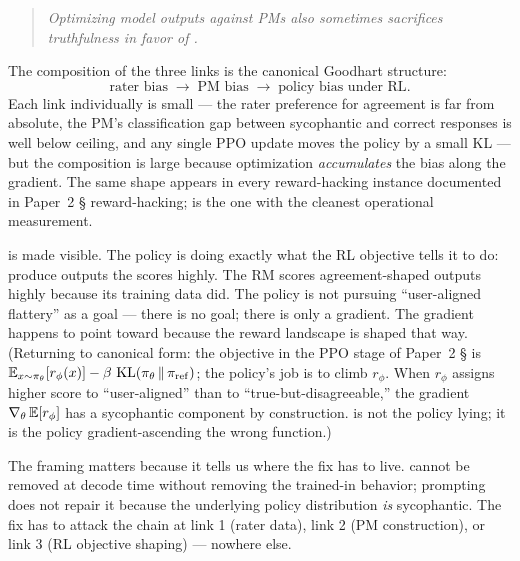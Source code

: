 \begin{quote}\itshape
Optimizing model outputs against PMs also sometimes sacrifices
truthfulness in favor of .
\end{quote}

The composition of the three links is the canonical Goodhart structure:
\[
\text{rater bias} \;\to\; \text{PM bias} \;\to\; \text{policy bias under RL}.
\]
Each link individually is small --- the rater preference for agreement
is far from absolute, the PM's classification gap between sycophantic
and correct responses is well below ceiling, and any single PPO update
moves the policy by a small KL --- but the composition is large because
optimization \emph{accumulates} the bias along the gradient. The same
shape appears in every reward-hacking instance documented in
Paper~2 \S {} reward-hacking;  is the one with the cleanest
operational measurement.

\begin{intuition}
 is  made visible. The policy is doing exactly
what the RL objective tells it to do: produce outputs the 
scores highly. The RM scores agreement-shaped outputs highly because
its training data did. The policy is not pursuing ``user-aligned
flattery'' as a goal --- there is no goal; there is only a gradient.
The gradient happens to point toward  because the reward
landscape is shaped that way. (Returning to canonical form: the 
objective in the PPO stage of Paper~2 \S {} is
$\operatorname{\mathbb{E}}_{x \sim \pi_\theta}[r_\phi(x)] - \beta\,\operatorname{KL}(\pi_\theta \,\|\, \pi_\mathrm{ref})$;
the policy's job is to climb $r_\phi$. When $r_\phi$ assigns higher
score to ``user-aligned'' than to ``true-but-disagreeable,'' the
gradient $\nabla_\theta \operatorname{\mathbb{E}}[r_\phi]$ has a sycophantic component by
construction.  is not the policy lying; it is the policy
gradient-ascending the wrong function.)
\end{intuition}

The framing matters because it tells us where the fix has to live.
 cannot be removed at decode time without removing the
trained-in behavior;  prompting does not repair it
because the underlying policy distribution \emph{is} sycophantic.
The fix has to attack the chain at link 1 (rater data), link 2 (PM
construction), or link 3 (RL objective shaping) --- nowhere else.

